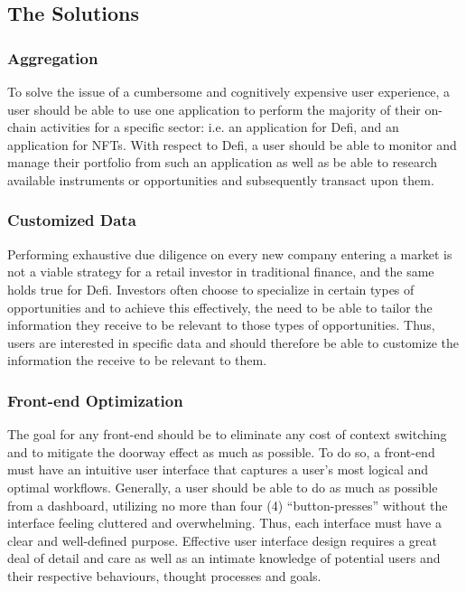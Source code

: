 \documentclass[10pt]{article}
\begin{document}
					\subsection{The Solutions}
					\subsubsection{Aggregation}
					To solve the issue of a cumbersome and cognitively expensive user experience,
					a user should be able to use one application to perform the majority of their
					on-chain activities for a specific sector: i.e. an application for Defi, and an
					application for NFTs. With respect to Defi, a user should be able to monitor
					and manage their portfolio from such an application as well as be able to
					research available instruments or opportunities and subsequently transact upon
					them.
					\subsubsection{Customized Data}
					Performing exhaustive due diligence on every new company entering a market is
					not a viable strategy for a retail investor in traditional finance, and the same
					holds true for Defi. Investors often choose to specialize in certain types of
					opportunities and to achieve this effectively, the need to be able to tailor the
					information they receive to be relevant to those types of opportunities. Thus,
					users are interested in specific data and should therefore be able to customize
					the information the receive to be relevant to them.
					\subsubsection{Front-end Optimization}
					The goal for any front-end should be to eliminate any cost of context switching
					and to mitigate the doorway effect as much as possible. To do so, a front-end
					must have an intuitive user interface that captures a user's most logical and
					optimal workflows. Generally, a user should be able to do as much as possible
					from a dashboard, utilizing no more than four (4) ``button-presses'' without the
					interface feeling cluttered and overwhelming. Thus, each interface must have
					a clear and well-defined purpose. Effective user interface design requires
					a great deal of detail and care as well  as an intimate knowledge of potential
					users and their respective behaviours, thought processes and goals.
\end{document}
